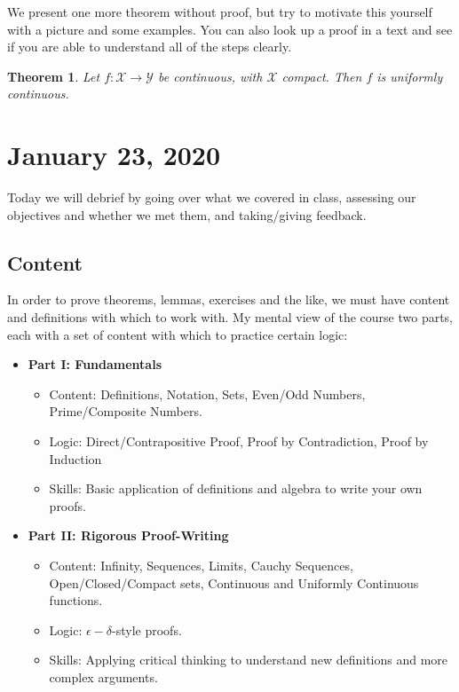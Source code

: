 \documentclass[11pt]{article}
\newcommand{\X}{\ensuremath{\mathcal X}}
\newcommand{\Y}{\ensuremath{\mathcal Y}}
\newcommand{\e}{\epsilon}
\theoremstyle{plain}
\newtheorem{thm}{Theorem}[section]
\theoremstyle{definition}
\theoremstyle{remark}
\begin{document}
We present one more theorem without proof, but try to motivate this yourself with a picture and some examples. You can also look up a proof in a text and see if you are able to understand all of the steps clearly.
\begin{thm}
    Let $f: \X \rightarrow \Y$ be continuous, with $\X$ compact. Then $f$ is uniformly continuous.
\end{thm}

\section{January 23, 2020}

Today we will debrief by going over what we covered in class, assessing our objectives and whether we met them, and taking/giving feedback.

\subsection*{Content}

In order to prove theorems, lemmas, exercises and the like, we must have content and definitions with which to work with. My mental view of the course two parts, each with a set of content with which to practice certain logic:
\begin{itemize}
    \item {\bf Part I: Fundamentals}
    \begin{itemize}
        \item Content: Definitions, Notation, Sets, Even/Odd Numbers, Prime/Composite Numbers.
        \item Logic: Direct/Contrapositive Proof, Proof by Contradiction, Proof by Induction
        \item Skills: Basic application of definitions and algebra to write your own proofs.
    \end{itemize}
    \item {\bf Part II: Rigorous Proof-Writing}
    \begin{itemize}
        \item Content: Infinity, Sequences, Limits, Cauchy Sequences, Open/Closed/Compact sets, Continuous and Uniformly Continuous functions.
        \item Logic: $\e-\delta$-style proofs.
        \item Skills: Applying critical thinking to understand new definitions and more complex arguments.
    \end{itemize}
\end{itemize}
\end{document}
